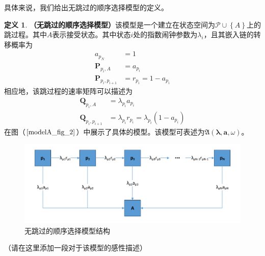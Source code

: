 \documentclass[UTF8]{ctexart}
\theoremstyle{plain}
\theoremstyle{definition}
\newtheorem{defn}{定义}[section]
\theoremstyle{remark}
\begin{document}
	具体来说，我们给出无跳过的顺序选择模型的定义。
	\begin{defn}\textbf{（无跳过的顺序选择模型）}该模型是一个建立在状态空间为$\mathcal{P} \cup \left\{A\right\}$上的跳过程。其中$A$表示接受状态。其中状态$i$处的指数闹钟参数为$\lambda_i$，且其嵌入链的转移概率为
	\begin{equation}
	\begin{aligned}
	a_{p_N} & = 1 \\
	\bm{P}_{p_i,A}  & = a_{p_i}  \\
	\bm{P}_{p_i,p_{i+1}} & = r_{p_i} = 1 - a_{p_i}
	\end{aligned}
	\end{equation}
	相应地，该跳过程的速率矩阵可以描述为
	\begin{equation}
	\begin{aligned}
	\bm{Q}_{p_i,A} & = \lambda_{p_i} a_{p_i} \\
	\bm{Q}_{p_i,p_{i+1}} & = \lambda_{p_i} r_{p_i} = \lambda_{p_i} ( 1 - a_{p_i})
	\end{aligned}
	\end{equation}
	在图（$\ref{modelA_fig_2}$）中展示了具体的模型。该模型可表述为$\mathfrak{A}\left(\bm{\lambda}, \bm{a}, \omega\right)$。
	\end{defn}
	\begin{figure}[H] 
		\centering
		\includegraphics[width = 12cm]{modelA_fig_2.pdf}
		\caption{无跳过的顺序选择模型结构}\label{modelA_fig_2}
	\end{figure}
	（请在这里添加一段对于该模型的感性描述）
\end{document}
